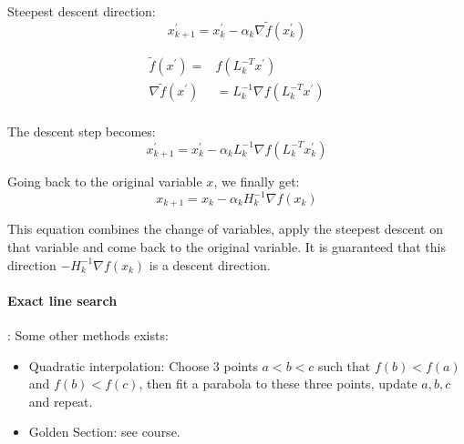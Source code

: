 Steepest descent direction:
\begin{equation}
    x^{\prime}_{k+1} = x^{\prime}_ k - \alpha_k \nabla \tilde{f}(x^{\prime}_k)
\end{equation}


\begin{equation}
    \begin{split}
        \tilde{f}(x^\prime) =& f(L_k^{-T}x^\prime) \\
        \nabla \tilde{f}(x^\prime) &= L^{-1}_k \nabla f(L_k^{-T}x^\prime) \\
    \end{split}
\end{equation}

The descent step becomes:
\begin{equation}
    x_{k+1}^\prime = x_k^\prime - \alpha_k L_k^{-1} \nabla f(L_k^{-T}x_k^\prime)
\end{equation}

Going back to the original variable $x$, we finally get:
\begin{equation}
    x_{k+1} = x_k - \alpha_k H_k^{-1} \nabla f(x_k)
\end{equation}

This equation combines the change of variables, apply the steepest descent on that variable and come back to the original variable.
It is guaranteed that this direction $-H_k^{-1}\nabla f(x_k)$ is a descent direction.

\paragraph{Exact line search}: Some other methods exists:
\begin{itemize}
    \item Quadratic interpolation: Choose 3 points $a < b < c$ such that $f(b) < f(a)$ and $f(b) < f(c)$, then fit a parabola to these three points, update $a, b, c$ and repeat.
    \item Golden Section: see course.
\end{itemize}